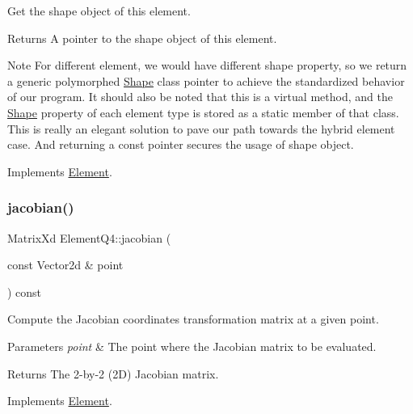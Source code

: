 Get the shape object of this element. 

\begin{DoxyReturn}{Returns}
A pointer to the shape object of this element.
\end{DoxyReturn}
\begin{DoxyNote}{Note}
For different element, we would have different shape property, so we return a generic polymorphed \mbox{\hyperlink{class_shape}{Shape}} class pointer to achieve the standardized behavior of our program. It should also be noted that this is a virtual method, and the \mbox{\hyperlink{class_shape}{Shape}} property of each element type is stored as a static member of that class. This is really an elegant solution to pave our path towards the hybrid element case. And returning a const pointer secures the usage of shape object. 
\end{DoxyNote}


Implements \mbox{\hyperlink{class_element_a54c5c297abff4ac3abacd815342a9645}{Element}}.

\mbox{\label{class_element_q4_a1347c3ce4ef1c34a16aa72fdf593932d}} 
\subsubsection{\texorpdfstring{jacobian()}{jacobian()}}
{\footnotesize\ttfamily Matrix\+Xd Element\+Q4\+::jacobian (\begin{DoxyParamCaption}\item[{const Vector2d \&}]{point }\end{DoxyParamCaption}) const\hspace{0.3cm}{\ttfamily [virtual]}}



Compute the Jacobian coordinates transformation matrix at a given point. 


\begin{DoxyParams}{Parameters}
{\em point} & The point where the Jacobian matrix to be evaluated. \\
\hline
\end{DoxyParams}
\begin{DoxyReturn}{Returns}
The 2-\/by-\/2 (2D) Jacobian matrix. 
\end{DoxyReturn}


Implements \mbox{\hyperlink{class_element_ad469c745f0bcb9d7a3431b1608c1ade6}{Element}}.

